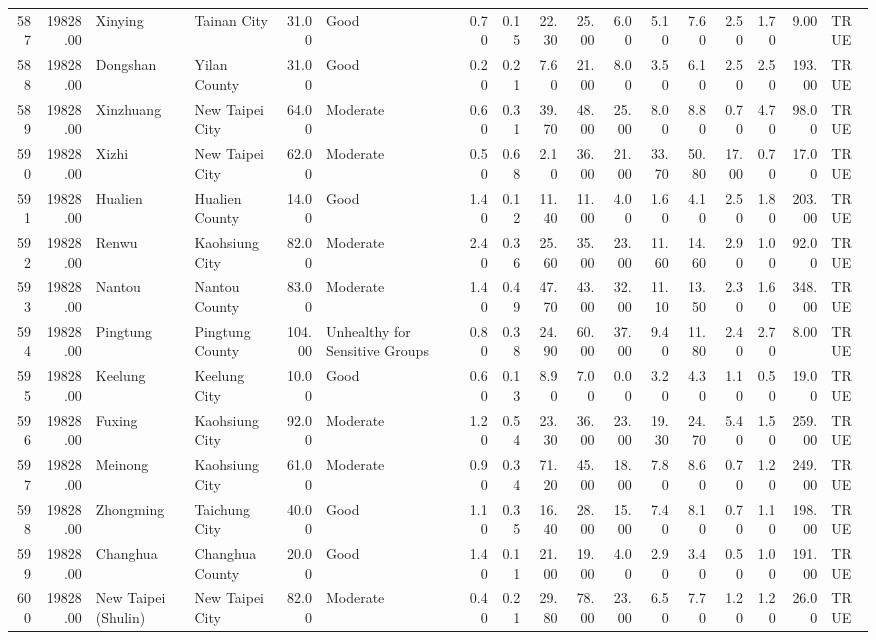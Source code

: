 \begin{table}[ht]
\begin{tabular}{rrllrlrrrrrrrrrrl}
  587 & 19828.00 & Xinying & Tainan City & 31.00 & Good & 0.70 & 0.15 & 22.30 & 25.00 & 6.00 & 5.10 & 7.60 & 2.50 & 1.70 & 9.00 & TRUE \\ 
  588 & 19828.00 & Dongshan & Yilan County & 31.00 & Good & 0.20 & 0.21 & 7.60 & 21.00 & 8.00 & 3.50 & 6.10 & 2.50 & 2.50 & 193.00 & TRUE \\ 
  589 & 19828.00 & Xinzhuang & New Taipei City & 64.00 & Moderate & 0.60 & 0.31 & 39.70 & 48.00 & 25.00 & 8.00 & 8.80 & 0.70 & 4.70 & 98.00 & TRUE \\ 
  590 & 19828.00 & Xizhi & New Taipei City & 62.00 & Moderate & 0.50 & 0.68 & 2.10 & 36.00 & 21.00 & 33.70 & 50.80 & 17.00 & 0.70 & 17.00 & TRUE \\ 
  591 & 19828.00 & Hualien & Hualien County & 14.00 & Good & 1.40 & 0.12 & 11.40 & 11.00 & 4.00 & 1.60 & 4.10 & 2.50 & 1.80 & 203.00 & TRUE \\ 
  592 & 19828.00 & Renwu & Kaohsiung City & 82.00 & Moderate & 2.40 & 0.36 & 25.60 & 35.00 & 23.00 & 11.60 & 14.60 & 2.90 & 1.00 & 92.00 & TRUE \\ 
  593 & 19828.00 & Nantou & Nantou County & 83.00 & Moderate & 1.40 & 0.49 & 47.70 & 43.00 & 32.00 & 11.10 & 13.50 & 2.30 & 1.60 & 348.00 & TRUE \\ 
  594 & 19828.00 & Pingtung & Pingtung County & 104.00 & Unhealthy for Sensitive Groups & 0.80 & 0.38 & 24.90 & 60.00 & 37.00 & 9.40 & 11.80 & 2.40 & 2.70 & 8.00 & TRUE \\ 
  595 & 19828.00 & Keelung & Keelung City & 10.00 & Good & 0.60 & 0.13 & 8.90 & 7.00 & 0.00 & 3.20 & 4.30 & 1.10 & 0.50 & 19.00 & TRUE \\ 
  596 & 19828.00 & Fuxing & Kaohsiung City & 92.00 & Moderate & 1.20 & 0.54 & 23.30 & 36.00 & 23.00 & 19.30 & 24.70 & 5.40 & 1.50 & 259.00 & TRUE \\ 
  597 & 19828.00 & Meinong & Kaohsiung City & 61.00 & Moderate & 0.90 & 0.34 & 71.20 & 45.00 & 18.00 & 7.80 & 8.60 & 0.70 & 1.20 & 249.00 & TRUE \\ 
  598 & 19828.00 & Zhongming & Taichung City & 40.00 & Good & 1.10 & 0.35 & 16.40 & 28.00 & 15.00 & 7.40 & 8.10 & 0.70 & 1.10 & 198.00 & TRUE \\ 
  599 & 19828.00 & Changhua & Changhua County & 20.00 & Good & 1.40 & 0.11 & 21.00 & 19.00 & 4.00 & 2.90 & 3.40 & 0.50 & 1.00 & 191.00 & TRUE \\ 
  600 & 19828.00 & New Taipei (Shulin) & New Taipei City & 82.00 & Moderate & 0.40 & 0.21 & 29.80 & 78.00 & 23.00 & 6.50 & 7.70 & 1.20 & 1.20 & 26.00 & TRUE \\ 

\end{tabular}
\end{table}
